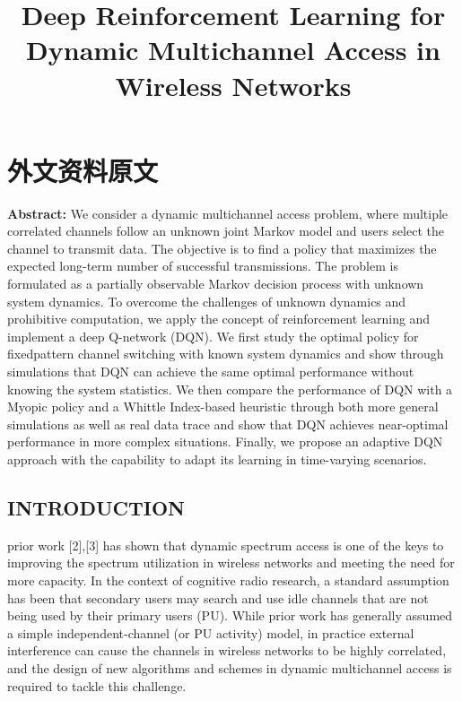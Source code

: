 \chapter{外文资料原文}
\label{cha:engorg}

\title{Deep Reinforcement Learning for Dynamic Multichannel Access in Wireless Networks }

\textbf{Abstract:} We consider a dynamic multichannel access problem, where multiple correlated channels follow an unknown joint Markov model and users select the channel to transmit data. The objective is to ﬁnd a policy that maximizes the expected long-term number of successful transmissions. The problem is formulated as a partially observable Markov decision process with unknown system dynamics. To overcome the challenges of unknown dynamics and prohibitive computation, we apply the concept of reinforcement learning and implement a deep Q-network (DQN). We ﬁrst study the optimal policy for ﬁxedpattern channel switching with known system dynamics and show through simulations that DQN can achieve the same optimal performance without knowing the system statistics. We then compare the performance of DQN with a Myopic policy and a Whittle Index-based heuristic through both more general simulations as well as real data trace and show that DQN achieves near-optimal performance in more complex situations. Finally, we propose an adaptive DQN approach with the capability to adapt its learning in time-varying scenarios. 


\section{ INTRODUCTION }
prior work [2],[3] has shown that dynamic spectrum access is one of the keys to improving the spectrum utilization in wireless networks and meeting the need for more capacity. In the context of cognitive radio research, a standard assumption has been that secondary users may search and use idle channels that are not being used by their primary users (PU). While prior work has generally assumed a simple independent-channel (or PU activity) model, in practice external interference can cause the channels in wireless networks to be highly correlated, and the design of new algorithms and schemes in dynamic multichannel access is required to tackle this challenge.

